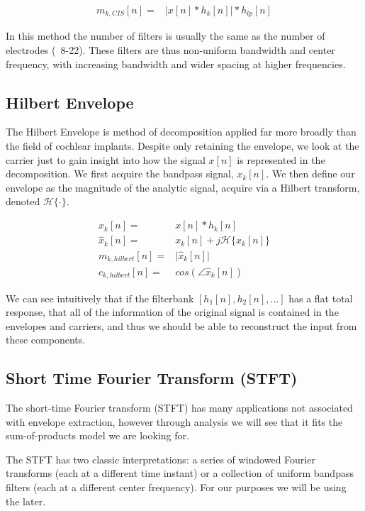 \documentclass [11pt, proquest,oneside] {uwthesis}[2015/03/03]
\begin{document}
\begin{align}
m_{k,CIS}[n] =& \Big| x[n] * h_k[n] \Big| * h_{lp}[n]
\end{align}

In this method the number of filters is usually the same as the number of electrodes (~8-22).  These filters are thus non-uniform bandwidth and center frequency, with increasing bandwidth and wider spacing at higher frequencies.

\subsection{Hilbert Envelope}

The Hilbert Envelope is method of decomposition applied far more broadly than the field of cochlear implants.  Despite only retaining the envelope, we look at the carrier just to gain insight into how the signal $x[n]$ is represented in the decomposition.  We first acquire the bandpass signal, $x_k[n]$.  We then define our envelope as the magnitude of the analytic signal, acquire via a Hilbert transform, denoted $\mathcal{H}\{\cdot\}$.

\begin{align}
x_k[n] =& x[n] * h_k[n] \\
\widehat{x}_k[n] =& x_k[n] + j\mathcal{H}\{x_k[n]\} \\
\label{eq:hilbert_envelope}
m_{k,hilbert}[n] =& \Big| \widehat{x}_k[n] \Big| \\
c_{k,hilbert}[n] =& cos(\angle\widehat{x}_k[n])
\end{align}

We can see intuitively that if the filterbank $[h_1[n], h_2[n], ...]$ has a flat total response, that all of the information of the original signal is contained in the envelopes and carriers, and thus we should be able to reconstruct the input from these components.

\subsection{Short Time Fourier Transform (STFT)}

The short-time Fourier transform (STFT) has many applications not associated with envelope extraction, however through analysis we will see that it fits the sum-of-products model we are looking for.

The STFT has two classic interpretations: a series of windowed Fourier transforms (each at a different time instant) or a collection of uniform bandpass filters (each at a different center frequency).  For our purposes we will be using the later.
\end{document}
